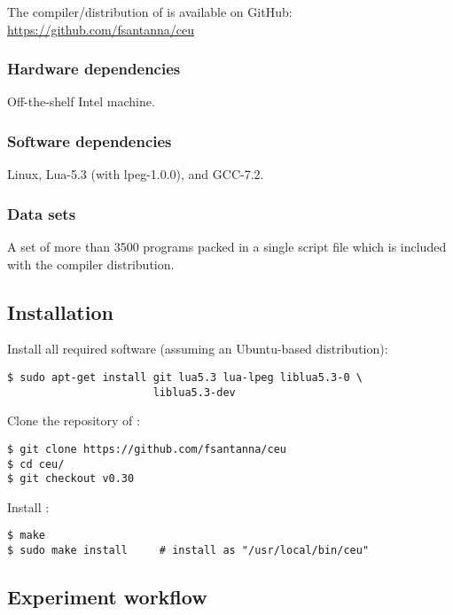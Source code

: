 {The compiler/distribution of \CEU is available on GitHub:
\url{https://github.com/fsantanna/ceu}

\subsubsection{Hardware dependencies}

Off-the-shelf Intel machine.

\subsubsection{Software dependencies}

Linux, Lua-5.3 (with lpeg-1.0.0), and GCC-7.2.

\subsubsection{Data sets}

A set of more than 3500 programs packed in a single script file which is
included with the compiler distribution.

\subsection{Installation}

Install all required software (assuming an Ubuntu-based distribution):

\begin{verbatim}
$ sudo apt-get install git lua5.3 lua-lpeg liblua5.3-0 \
                       liblua5.3-dev
\end{verbatim}

Clone the repository of \CEU:

\begin{verbatim}
$ git clone https://github.com/fsantanna/ceu
$ cd ceu/
$ git checkout v0.30
\end{verbatim}

Install \CEU:

\begin{verbatim}
$ make
$ sudo make install     # install as "/usr/local/bin/ceu"
\end{verbatim}

\subsection{Experiment workflow}

}
